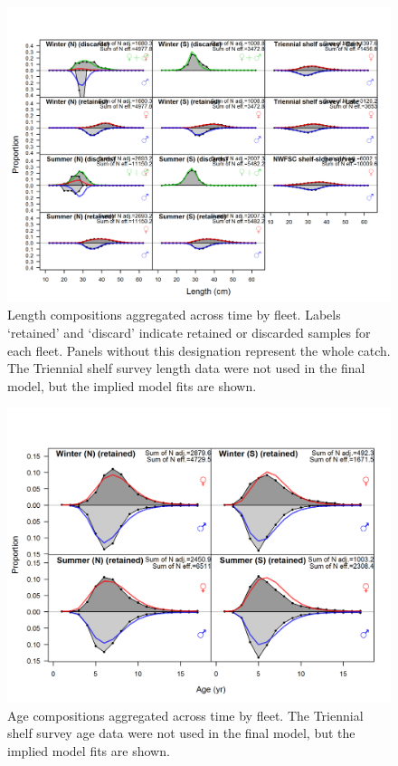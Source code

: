 \documentclass[12pt,]{article}
\begin{document}
\FloatBarrier

\begin{figure}[htbp]
\centering
\includegraphics{r4ss/plots_mod1/comp_lenfit__aggregated_across_time.png}
\caption{Length compositions aggregated across time by fleet. Labels
`retained' and `discard' indicate retained or discarded samples for each
fleet. Panels without this designation represent the whole catch. The
Triennial shelf survey length data were not used in the final model, but
the implied model fits are shown. \label{fig:length_agg}}
\end{figure}

\FloatBarrier

\begin{figure}[htbp]
\centering
\includegraphics{r4ss/plots_mod1/comp_agefit__aggregated_across_time.png}
\caption{Age compositions aggregated across time by fleet. The Triennial
shelf survey age data were not used in the final model, but the implied
model fits are shown. \label{fig:age_agg}}
\end{figure}
\end{document}

